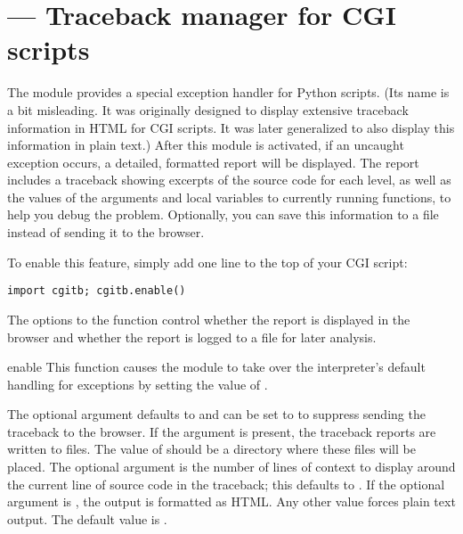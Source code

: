 \section{ ---
         Traceback manager for CGI scripts}



The  module provides a special exception handler for Python
scripts.  (Its name is a bit misleading.  It was originally designed to
display extensive traceback information in HTML for CGI scripts.  It was
later generalized to also display this information in plain text.)  After
this module is activated, if an uncaught exception occurs, a detailed,
formatted report will be displayed.  The report
includes a traceback showing excerpts of the source code for each level,
as well as the values of the arguments and local variables to currently
running functions, to help you debug the problem.  Optionally, you can
save this information to a file instead of sending it to the browser.

To enable this feature, simply add one line to the top of your CGI script:

\begin{verbatim}
import cgitb; cgitb.enable()
\end{verbatim}

The options to the  function control whether the
report is displayed in the browser and whether the report is logged
to a file for later analysis.


\begin{funcdesc}{enable}{}
  This function causes the  module to take over the
  interpreter's default handling for exceptions by setting the
  value of .

  The optional argument  defaults to  and can be set
  to  to suppress sending the traceback to the browser.
  If the argument  is present, the traceback reports are
  written to files.  The value of  should be a directory
  where these files will be placed.
  The optional argument  is the number of lines of
  context to display around the current line of source code in the
  traceback; this defaults to .
  If the optional argument  is , the output is
  formatted as HTML.  Any other value forces plain text output.  The default
  value is .
\end{funcdesc}

